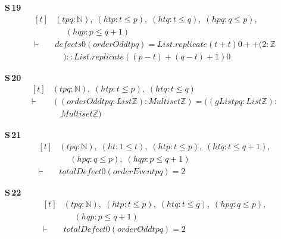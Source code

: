 \noindent\textbf{S\,19}\quad{}
{\footnotesize\[ \begin{aligned}[t]
&(\mathit{t} \mathit{p} \mathit{q} : \mathbb{N} ),\; (\mathit{htp} : \mathit{t} \leq \mathit{p}),\; (\mathit{htq} : \mathit{t} \leq \mathit{q}),\; (\mathit{hpq} : \mathit{q} \leq \mathit{p}),\\
&\quad \; (\mathit{hqp} : \mathit{p} \leq \mathit{q} + 1)\\
\vdash\;&\mathit{defects} 0 (\mathit{orderOdd} \mathit{t} \mathit{p} \mathit{q}) = \mathit{List}.\mathit{replicate} (\mathit{t} + \mathit{t}) 0 ++ (2 : \mathbb{Z}\\
&\quad ) :: \mathit{List}.\mathit{replicate} ((\mathit{p} - \mathit{t}) + (\mathit{q} - \mathit{t}) + 1) 0
\end{aligned} \]}

\noindent\textbf{S\,20}\quad{}
{\footnotesize\[ \begin{aligned}[t]
&(\mathit{t} \mathit{p} \mathit{q} : \mathbb{N} ),\; (\mathit{htp} : \mathit{t} \leq \mathit{p}),\; (\mathit{htq} : \mathit{t} \leq \mathit{q})\\
\vdash\;&((\mathit{orderOdd} \mathit{t} \mathit{p} \mathit{q} : \mathit{List} \mathbb{Z} ) : \mathit{Multiset} \mathbb{Z} ) = ((\mathit{gList} \mathit{p} \mathit{q} : \mathit{List} \mathbb{Z} ) :\\
&\quad \mathit{Multiset} \mathbb{Z} )
\end{aligned} \]}

\noindent\textbf{S\,21}\quad{}
{\footnotesize\[ \begin{aligned}[t]
&(\mathit{t} \mathit{p} \mathit{q} : \mathbb{N} ),\; (\mathit{ht} : 1 \leq \mathit{t}),\; (\mathit{htp} : \mathit{t} \leq \mathit{p}),\; (\mathit{htq} : \mathit{t} \leq \mathit{q} + 1),\\
&\quad \; (\mathit{hpq} : \mathit{q} \leq \mathit{p}),\; (\mathit{hqp} : \mathit{p} \leq \mathit{q} + 1)\\
\vdash\;&\mathit{totalDefect} 0 (\mathit{orderEven} \mathit{t} \mathit{p} \mathit{q}) = 2
\end{aligned} \]}

\noindent\textbf{S\,22}\quad{}
{\footnotesize\[ \begin{aligned}[t]
&(\mathit{t} \mathit{p} \mathit{q} : \mathbb{N} ),\; (\mathit{htp} : \mathit{t} \leq \mathit{p}),\; (\mathit{htq} : \mathit{t} \leq \mathit{q}),\; (\mathit{hpq} : \mathit{q} \leq \mathit{p}),\\
&\quad \; (\mathit{hqp} : \mathit{p} \leq \mathit{q} + 1)\\
\vdash\;&\mathit{totalDefect} 0 (\mathit{orderOdd} \mathit{t} \mathit{p} \mathit{q}) = 2
\end{aligned} \]}


